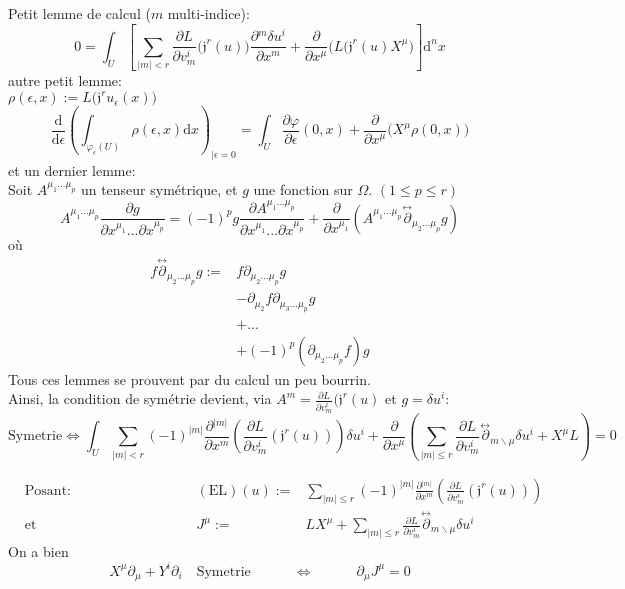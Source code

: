 \documentclass[a4paper,11pt]{article}
\renewcommand{\d}{{\mathrm{d}}}
\newcommand{\dr}[2]{\frac{\partial {#1}}{\partial{#2}}}
\begin{document}
Petit lemme de calcul ($m$ multi-indice):
$$0 = \int_U \left[\sum_{|m|<r}\dr L{v^i_m}\big(\mathfrak{j}^r(u)\big)\dr{^m\delta u^i}{x^m}+\dr{}{x^\mu}\big(L(\mathfrak{j}^r(u)X^\mu\big) \right] \d^n x$$
autre petit lemme:\\
$\rho(\epsilon,x):=L\big(\mathfrak{j}^ru_\epsilon(x)\big)$
$$\frac{\d}{\d \epsilon}\left( \int_{\varphi_\epsilon(U)}\rho(\epsilon,x) \d  x \right) _{\Big|\epsilon=0} = \int_U \dr\varphi\epsilon(0,x)+\dr{}{x^\mu}\big(X^\mu\rho(0,x)\big)$$
et un dernier lemme:\\
Soit $A^{\mu_1 ... \mu_p}$ un tenseur symétrique, et $g$ une fonction sur $\Omega$. $(1\leq p\leq r)$
$$A^{\mu_1...\mu_p} \dr g{x^{\mu_1}...\partial x^{\mu_p}} = (-1)^p g \dr{A^{\mu_1...\mu_p}}{x^{\mu_1}...\partial x^{\mu_p}} + \dr{}{x^{\mu_1}}\left(A^{\mu_1...\mu_p}\overset{\leftrightarrow}\partial_{\mu_2...\mu_p}g\right)$$
où
\begin{align*}
f\overset{\leftrightarrow}\partial_{\mu_2...\mu_p} g:=
& f \partial_{\mu_2...\mu_p} g\\
&- \partial_{\mu_2} f \partial_{\mu_3...\mu_p} g\\
&+ ...\\
&+ (-1)^p (\partial_{\mu_2...\mu_p} f) g
\end{align*}
Tous ces lemmes se prouvent par du calcul un peu bourrin.\\
Ainsi, la condition de symétrie devient, via $A^m=\dr L{v^i_m}(\mathfrak{j}^r(u)$ et $g=\delta u^i$:
$$\mathrm{Symetrie} \iff \int_U \sum_{|m|<r} (-1)^{|m|} \dr{^{|m|}}{x^m}\left(\dr L{v^i_m}(\mathfrak{j}^r(u))\right)\delta u^i + \dr{}{x^\mu} \left(\sum_{|m|\leq r} \dr L{v^i_m}\overset{\leftrightarrow}\partial_{m\backslash\mu} \delta u^i + X^\mu L\right) = 0$$

\begin{align*}
&\mathrm{Posant}:\quad\quad\quad\quad\quad\quad\quad\quad&(\mathrm{EL})(u):=& \sum_{|m|\leq r} (-1)^|m| \dr{^{|m|}}{x^m}\left(\dr L{v^i_m}(\mathfrak{j}^r(u))\right)
\quad\quad\quad\quad\quad\quad\quad\quad\quad\quad\\
&\mathrm{et}&
J^\mu :=& LX^\mu + \sum_{|m|\leq r} \dr L{v^i_m} \overset{\leftrightarrow}\partial_{m\backslash\mu} \delta u^i
\end{align*}
On a bien
$$X^\mu \partial_\mu + Y^i \partial_i\quad\mathrm{Symetrie} \quad \quad \quad \iff\quad \quad \quad 
 \partial_\mu J^\mu = 0$$
\end{document}
